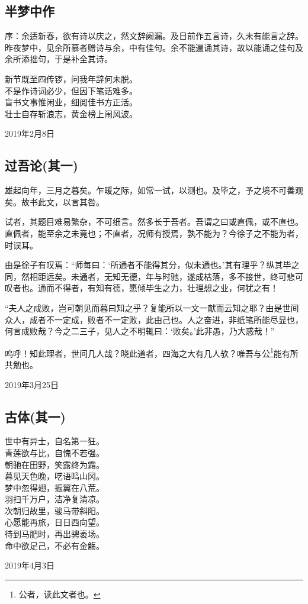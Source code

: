 \documentclass[a5paper]{ctexart}
\begin{document}
	\subsection{半梦中作}
	\begin{small}
		序：余适新春，欲有诗以庆之，然文辞阙漏。及日前作五言诗，久未有能言之辞。昨夜梦中，见余所慕者赠诗与余，中有佳句。余不能遍诵其诗，故以能诵之佳句及余所添拙句，于是补全其诗。
	\end{small}
	\begin{center}
		新节既至四传锣，问我年辞何未脱。\\
		不是作诗词必少，但因下笔话难多。\\
		盲书文事惟闲业，细阅佳书方正活。\\
		壮士自存斩浪志，黄金榜上闹风波。
	\end{center}
	\hfill 2019年2月8日
	
	\subsection{过吾论(其一)}
	雄起向年，三月之暮矣。乍暖之际，如常一试，以测也。及毕之，予之境不可善观矣。故书此文，以言其咎。
	
	试者，其题目难易繁杂，不可细言。然多长于吾者。吾谓之曰或直佩，或不直也。直佩者，能至余之未竟也；不直者，况师有授焉，孰不能为？今徐子之不能为者，时误耳。
	
	由是徐子有叹焉：“师每曰：‘所通者不能得其分，似未通也。'其有理乎？纵其毕之同，然相距远矣。未通者，无知无德，年与时驰，遂成枯落，多不接世，终可悲可叹者也。通而不得者，有知有德，愿倾毕生之力，壮理想之业，何犹之有！
	
	“夫人之成败，岂可朝见而暮曰知之乎？复能所以一文一献而云知之耶？由是世间众人，成者不一定成，败者不一定败，此由己也。人之奋进，非纸笔所能尽显也，何言成败哉？今之二三子，见人之不明辄曰：‘败矣。’此非愚，乃大惑哉！”
	
	呜呼！知此理者，世间几人哉？晓此道者，四海之大有几人欤？唯吾与公\footnote{公者，读此文者也。}能有所共勉也。
	\begin{flushright}
			2019年3月25日
	\end{flushright}
	
	\subsection{古体(其一)}
	\begin{center}
		世中有异士，自名第一狂。\\
		青莲欲与比，自愧不若强。\\
		朝驰在田野，笑露终为霜。\\
		暮见天色晚，呓语鸣山冈。\\
		梦中忽得翅，振翼在八荒。\\
		羽扫千万户，洁净复清凉。\\
		次朝归故里，骏马带斜阳。\\
		心愿能再旅，日日西向望。\\
		待到马肥时，再出骋袤场。\\
		命中欲足己，不必有金觞。
	\end{center}
	\hfill 2019年4月3日
	
\end{document}
